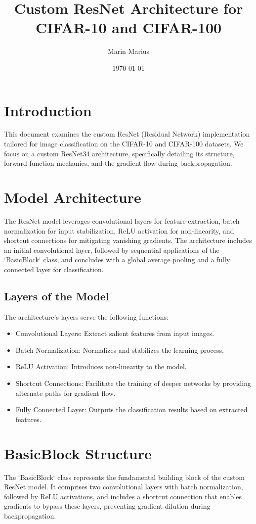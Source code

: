 \documentclass{article}
\title{Custom ResNet Architecture for CIFAR-10 and CIFAR-100}
\author{Marin Marius}
\date{\today}
\begin{document}
\maketitle

\section{Introduction}
This document examines the custom ResNet (Residual Network) implementation tailored for image classification on the CIFAR-10 and CIFAR-100 datasets. We focus on a custom ResNet34 architecture, specifically detailing its structure, forward function mechanics, and the gradient flow during backpropagation.

\section{Model Architecture}
The ResNet model leverages convolutional layers for feature extraction, batch normalization for input stabilization, ReLU activation for non-linearity, and shortcut connections for mitigating vanishing gradients. The architecture includes an initial convolutional layer, followed by sequential applications of the `BasicBlock` class, and concludes with a global average pooling and a fully connected layer for classification.

\subsection{Layers of the Model}
The architecture's layers serve the following functions:
\begin{itemize}
    \item Convolutional Layers: Extract salient features from input images.
    \item Batch Normalization: Normalizes and stabilizes the learning process.
    \item ReLU Activation: Introduces non-linearity to the model.
    \item Shortcut Connections: Facilitate the training of deeper networks by providing alternate paths for gradient flow.
    \item Fully Connected Layer: Outputs the classification results based on extracted features.
\end{itemize}

\section{BasicBlock Structure}
The `BasicBlock` class represents the fundamental building block of the custom ResNet model. It comprises two convolutional layers with batch normalization, followed by ReLU activations, and includes a shortcut connection that enables gradients to bypass these layers, preventing gradient dilution during backpropagation.
\end{document}
